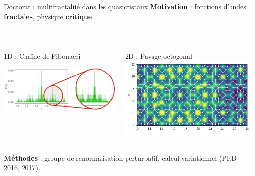 \begin{frame}{Doctorat : multifractalité dans les quasicristaux}
\textbf{Motivation} : fonctions d'ondes \textbf{fractales}, physique \textbf{critique}

~

\begin{columns}
	\begin{column}{0.5\textwidth}
		1D : Chaîne de Fibonacci 
		
		{
		\centering
		
		\includegraphics[width=\columnwidth]{img/1_travaux/heights}
		}
	\end{column}
	\begin{column}{0.5\textwidth}
		2D : Pavage octogonal
		\includegraphics[width=\columnwidth]{img/1_travaux/SKK}
	\end{column}
\end{columns}
\textbf{Méthodes} : groupe de renormalisation perturbatif, calcul variationnel (PRB 2016, 2017).
\end{frame}

